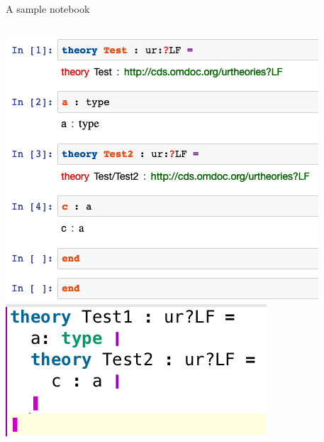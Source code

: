 \documentclass{beamer}
\begin{document}
    \begin{frame}{A sample notebook}
         \begin{columns}
            \centering
            \includegraphics[scale=0.4]{images/notebooknested}
            \centering
            \includegraphics[scale=0.8]{images/theorynested}
        \end{columns}
    \end{frame}
\end{document}
